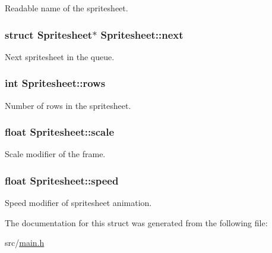Readable name of the spritesheet. \hypertarget{structSpritesheet_a671f77f759138aa2c852e5252b6daac5}{
\subsubsection[{next}]{\setlength{\rightskip}{0pt plus 5cm}struct {\bf Spritesheet}$\ast$ Spritesheet\-::next}}\label{structSpritesheet_a671f77f759138aa2c852e5252b6daac5}
Next spritesheet in the queue. \hypertarget{structSpritesheet_aeab321ce6cdd45cc8a5078e80480510e}{
\subsubsection[{rows}]{\setlength{\rightskip}{0pt plus 5cm}int Spritesheet\-::rows}}\label{structSpritesheet_aeab321ce6cdd45cc8a5078e80480510e}
Number of rows in the spritesheet. \hypertarget{structSpritesheet_ac46cf3d01609f66aae140e3b7d3d1109}{
\subsubsection[{scale}]{\setlength{\rightskip}{0pt plus 5cm}float Spritesheet\-::scale}}\label{structSpritesheet_ac46cf3d01609f66aae140e3b7d3d1109}
Scale modifier of the frame. \hypertarget{structSpritesheet_ad011770ca540de2bad85f0cb155c774b}{
\subsubsection[{speed}]{\setlength{\rightskip}{0pt plus 5cm}float Spritesheet\-::speed}}\label{structSpritesheet_ad011770ca540de2bad85f0cb155c774b}
Speed modifier of spritesheet animation. 

The documentation for this struct was generated from the following file\-:\begin{DoxyCompactItemize}
\item 
src/\hyperlink{main_8h}{main.\-h}\end{DoxyCompactItemize}
